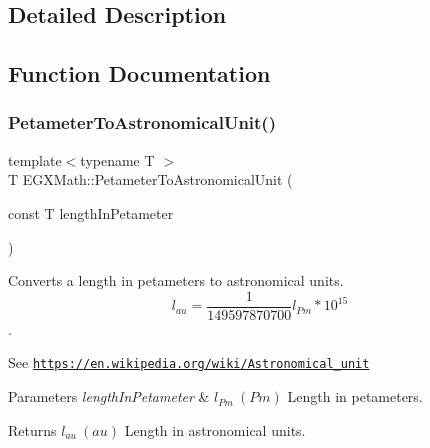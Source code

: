 \subsection{Detailed Description}


\subsection{Function Documentation}
\mbox{\label{group___e_g_x_math-_conversions-_length_conversions-_s_i-_petameter-_astronomical_ga8d28d4fb81bdbac19c416be69973fcf9}} 
\subsubsection{\texorpdfstring{Petameter\+To\+Astronomical\+Unit()}{PetameterToAstronomicalUnit()}}
{\footnotesize\ttfamily template$<$typename T $>$ \\
T E\+G\+X\+Math\+::\+Petameter\+To\+Astronomical\+Unit (\begin{DoxyParamCaption}\item[{const T}]{length\+In\+Petameter }\end{DoxyParamCaption})}



Converts a length in petameters to astronomical units. \[ l_{au}= \frac{1}{149597870700} l_{Pm} * 10^{15} \]. 

See \href{https://en.wikipedia.org/wiki/Astronomical_unit}{\tt https\+://en.\+wikipedia.\+org/wiki/\+Astronomical\+\_\+unit} 
\begin{DoxyParams}{Parameters}
{\em length\+In\+Petameter} & $ l_{Pm}\ (Pm)$ Length in petameters. \\
\hline
\end{DoxyParams}
\begin{DoxyReturn}{Returns}
$ l_{au}\ (au)$ Length in astronomical units. 
\end{DoxyReturn}
\mbox{\label{group___e_g_x_math-_conversions-_length_conversions-_s_i-_petameter-_astronomical_gaea87071d89d0f8dbb3b4df023587b82f}} 
